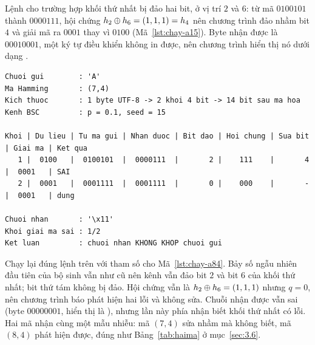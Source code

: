 Lệnh  cho trường hợp khối thứ nhất
bị đảo hai bit, ở vị trí $2$ và $6$: từ mã $0100101$ thành $0000111$, hội chứng
$h_2 \oplus h_6 = (1,1,1) = h_4$ nên chương trình đảo nhầm bit $4$ và giải mã ra
$0001$ thay vì $0100$ (Mã~\ref{lst:chay-a15}). Byte nhận được là $00010001$,
một ký tự điều khiển không in được, nên chương trình hiển thị nó dưới dạng
.

\par\medskip\noindent
\begin{minipage}{\linewidth}
\label{lst:chay-a15}
\end{minipage}
\par\nopagebreak
\begin{Verbatim}[fontsize=\scriptsize]
Chuoi gui        : 'A'
Ma Hamming       : (7,4)
Kich thuoc       : 1 byte UTF-8 -> 2 khoi 4 bit -> 14 bit sau ma hoa
Kenh BSC         : p = 0.1, seed = 15

Khoi | Du lieu | Tu ma gui | Nhan duoc | Bit dao | Hoi chung | Sua bit | Giai ma | Ket qua
   1 |  0100   |  0100101  |  0000111  |       2 |    111    |       4 |  0001   | SAI
   2 |  0001   |  0001111  |  0001111  |       0 |    000    |       - |  0001   | dung

Chuoi nhan       : '\x11'
Khoi giai ma sai : 1/2
Ket luan         : chuoi nhan KHONG KHOP chuoi gui
\end{Verbatim}

Chạy lại đúng lệnh trên với tham số  cho Mã~\ref{lst:chay-a84}. Bảy
số ngẫu nhiên đầu tiên của bộ sinh vẫn như cũ nên kênh vẫn đảo bit $2$ và bit
$6$ của khối thứ nhất; bit thứ tám không bị đảo. Hội chứng vẫn là
$h_2 \oplus h_6 = (1,1,1)$ nhưng $q = 0$, nên chương trình báo phát hiện hai lỗi và
không sửa. Chuỗi nhận được vẫn sai (byte $00000001$, hiển thị là
), nhưng lần này phía nhận biết khối thứ nhất có lỗi.
Hai mã nhận cùng một mẫu nhiễu: mã $(7,4)$ sửa nhầm mà không biết, mã $(8,4)$
phát hiện được, đúng như Bảng~\ref{tab:haima} ở mục~\ref{sec:3.6}.

